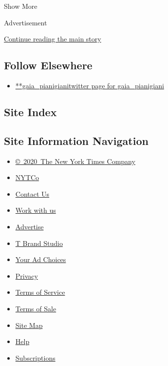 Show More

Advertisement

\protect\hyperlink{after-mid2}{Continue reading the main story}

\hypertarget{follow-elsewhere}{%
\subsection{Follow Elsewhere}\label{follow-elsewhere}}

\begin{itemize}
\tightlist
\item
  \href{https://twitter.com/gaia_pianigiani}{**gaia\_pianigianitwitter
  page for gaia\_pianigiani}
\end{itemize}

\hypertarget{site-index}{%
\subsection{Site Index}\label{site-index}}

\hypertarget{site-information-navigation}{%
\subsection{Site Information
Navigation}\label{site-information-navigation}}

\begin{itemize}
\tightlist
\item
  \href{https://help.nytimes.com/hc/en-us/articles/115014792127-Copyright-notice}{©~2020~The
  New York Times Company}
\end{itemize}

\begin{itemize}
\tightlist
\item
  \href{https://www.nytco.com/}{NYTCo}
\item
  \href{https://help.nytimes.com/hc/en-us/articles/115015385887-Contact-Us}{Contact
  Us}
\item
  \href{https://www.nytco.com/careers/}{Work with us}
\item
  \href{https://nytmediakit.com/}{Advertise}
\item
  \href{http://www.tbrandstudio.com/}{T Brand Studio}
\item
  \href{https://www.nytimes.com/privacy/cookie-policy\#how-do-i-manage-trackers}{Your
  Ad Choices}
\item
  \href{https://www.nytimes.com/privacy}{Privacy}
\item
  \href{https://help.nytimes.com/hc/en-us/articles/115014893428-Terms-of-service}{Terms
  of Service}
\item
  \href{https://help.nytimes.com/hc/en-us/articles/115014893968-Terms-of-sale}{Terms
  of Sale}
\item
  \href{https://spiderbites.nytimes.com}{Site Map}
\item
  \href{https://help.nytimes.com/hc/en-us}{Help}
\item
  \href{https://www.nytimes.com/subscription?campaignId=37WXW}{Subscriptions}
\end{itemize}
